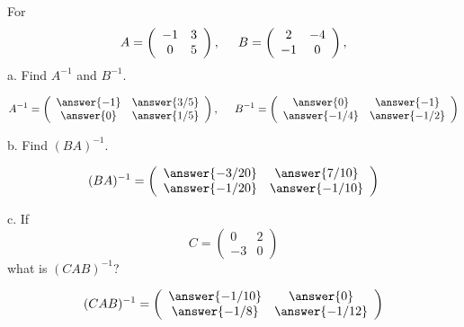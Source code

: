 \documentclass{ximera}
\begin{document}
\begin{exercise}
For
\[ A= \left(\begin{array}{cc}
  -1 & 3   \\
  0 &  5
\end{array}\right), \hspace{.5cm} B= \left(\begin{array}{cc}
  2 & -4   \\
  -1 &  0
\end{array}\right),
\]
a. Find $A^{-1}$ and $B^{-1}$.

\begin{prompt}
\[ A^{-1}= \left(\begin{array}{cc}
  \answer{-1} & \answer{3/5}   \\
  \answer{0} & \answer{1/5}
\end{array}\right), \hspace{.5cm} B^{-1}= \left(\begin{array}{cc}
  \answer{0} & \answer{-1}   \\
  \answer{-1/4} & \answer{-1/2}
\end{array}\right)\]
\end{prompt}

b. Find $(BA)^{-1}$.

\begin{prompt}
\[(BA)^{-1} = \left(\begin{array}{cc}
  \answer{-3/20} & \answer{7/10}   \\
  \answer{-1/20} & \answer{-1/10}
\end{array}\right)
\]
\end{prompt}

c. If
\[C = \left(\begin{array}{cc}
  0&2\\
  -3&0
\end{array}\right)
\]
what is $(CAB)^{-1}$?

\begin{prompt}
\[(CAB)^{-1}= \left(\begin{array}{cc}
  \answer{-1/10} & \answer{0}   \\
  \answer{-1/8} & \answer{-1/12}
\end{array}\right)
\]
\end{prompt}
\end{exercise}
\end{document}
